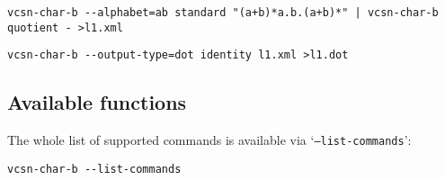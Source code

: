 \documentclass[a4paper]{report}
\newcommand\option[1]{`\texttt{#1}'}
\begin{document}
\begin{verbatim}
vcsn-char-b --alphabet=ab standard "(a+b)*a.b.(a+b)*" | vcsn-char-b quotient - >l1.xml
\end{verbatim}
\begin{verbatim}
vcsn-char-b --output-type=dot identity l1.xml >l1.dot
\end{verbatim}

\subsection{Available functions}

The whole list of supported commands is available via
\option{--list-commands}:

\begin{verbatim}
vcsn-char-b --list-commands
\end{verbatim}
\end{document}
